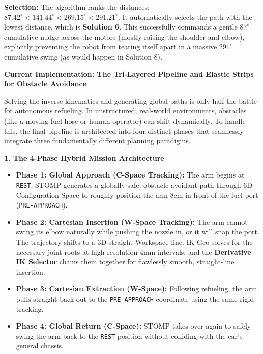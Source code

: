 \documentclass[11pt, a4paper]{article}
\begin{document}
\textbf{Selection:} The algorithm ranks the distances: $87.42^\circ < 141.44^\circ < 269.15^\circ < 291.21^\circ$. It automatically selects the path with the lowest distance, which is \textbf{Solution 6}. This successfully commands a gentle $87^\circ$ cumulative nudge across the motors (mostly raising the shoulder and elbow), explicitly preventing the robot from tearing itself apart in a massive $291^\circ$ cumulative swing (as would happen in Solution 8).

\clearpage


{\Large\textbf{Current Implementation: The Tri-Layered Pipeline and Elastic Strips for Obstacle Avoidance}}

Solving the inverse kinematics and generating global paths is only half the battle for autonomous refueling. In unstructured, real-world environments, obstacles (like a moving fuel hose or human operator) can shift dynamically. To handle this, the final pipeline is architected into four distinct phases that seamlessly integrate three fundamentally different planning paradigms.

\vspace{0.4cm}
{\large\textbf{1. The 4-Phase Hybrid Mission Architecture}}

\begin{itemize}
    \item \textbf{Phase 1: Global Approach (C-Space Tracking):} The arm begins at \texttt{REST}. STOMP generates a globally safe, obstacle-avoidant path through 6D Configuration Space to roughly position the arm 8cm in front of the fuel port (\texttt{PRE-APPROACH}).
    \item \textbf{Phase 2: Cartesian Insertion (W-Space Tracking):} The arm cannot swing its elbow naturally while pushing the nozzle in, or it will snap the port. The trajectory shifts to a 3D straight Workspace line. IK-Geo solves for the necessary joint roots at high-resolution 4mm intervals, and the \textbf{Derivative IK Selector} chains them together for flawlessly smooth, straight-line insertion.
    \item \textbf{Phase 3: Cartesian Extraction (W-Space):} Following refueling, the arm pulls straight back out to the \texttt{PRE-APPROACH} coordinate using the same rigid tracking.
    \item \textbf{Phase 4: Global Return (C-Space):} STOMP takes over again to safely swing the arm back to the \texttt{REST} position without colliding with the car's general chassis.
\end{itemize}
\end{document}
